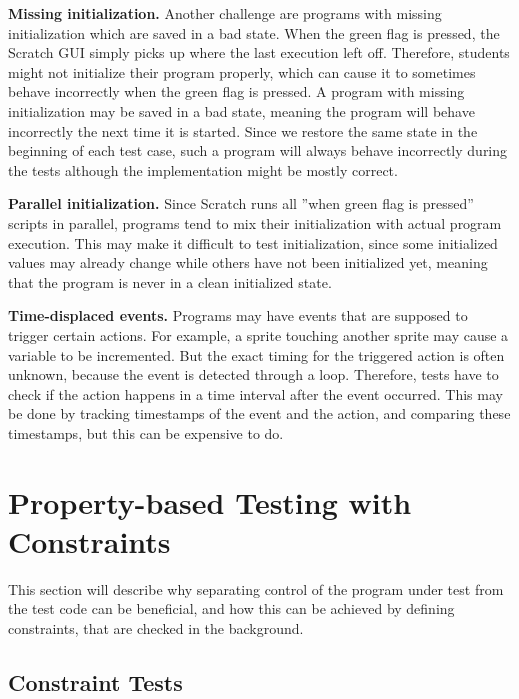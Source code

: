 \textbf{Missing initialization.}
Another challenge are programs with missing initialization which are saved in a bad state.
When the green flag is pressed, the Scratch GUI simply picks up where the last execution left off.
Therefore, students might not initialize their program properly,
which can cause it to sometimes behave incorrectly when the green flag is pressed.
A program with missing initialization may be saved in a bad state,
meaning the program will behave incorrectly the next time it is started.
Since we restore the same state in the beginning of each test case,
such a program will always behave incorrectly during the tests although the implementation might be mostly correct.
\parspace

\textbf{Parallel initialization.}
Since Scratch runs all ''when green flag is pressed'' scripts in parallel,
programs tend to mix their initialization with actual program execution.
This may make it difficult to test initialization,
since some initialized values may already change while others have not been initialized yet,
meaning that the program is never in a clean initialized state.
\parspace

\textbf{Time-displaced events.}
Programs may have events that are supposed to trigger certain actions.
For example, a sprite touching another sprite may cause a variable to be incremented.
But the exact timing for the triggered action is often unknown, because the event is detected through a loop.
Therefore, tests have to check if the action happens in a time interval after the event occurred.
This may be done by tracking timestamps of the event and the action, and comparing these timestamps,
but this can be expensive to do.
\parspace

\chapter{Property-based Testing with Constraints}
\label{cha:using_constraints_for_flexible_test_inputs}

This section will describe why separating control of the program under test from the test code can be beneficial,
and how this can be achieved by defining constraints, that are checked in the background.

\section{Constraint Tests}
\label{sec:input_independent_constraint_only_tests}

